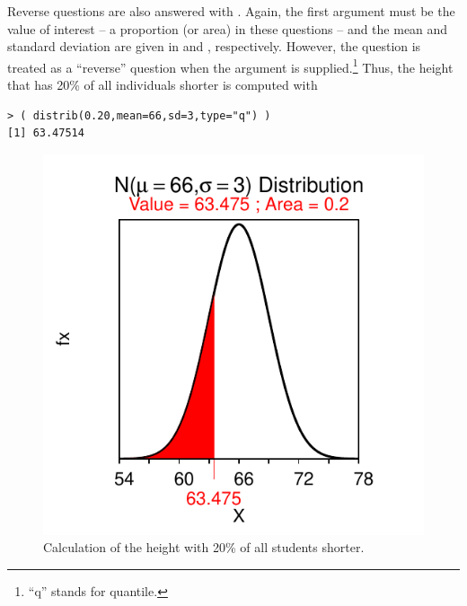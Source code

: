 \documentclass[10pt,openany]{book}\usepackage[]{graphicx}\usepackage[]{color}
\makeatletter
\newenvironment{kframe}{%
 \def\at@end@of@kframe{}%
 \ifinner\ifhmode%
  \def\at@end@of@kframe{\end{minipage}}%
  \begin{minipage}{\columnwidth}%
 \fi\fi%
 \def\FrameCommand##1{\hskip\@totalleftmargin \hskip-\fboxsep
 \colorbox{shadecolor}{##1}\hskip-\fboxsep
     \hskip-\linewidth \hskip-\@totalleftmargin \hskip\columnwidth}%
 \MakeFramed {\advance\hsize-\width
   \@totalleftmargin\z@ \linewidth\hsize
   \@setminipage}}%
 {\par\unskip\endMakeFramed%
 \at@end@of@kframe}
\newenvironment{knitrout}{}{} %
\makeatother
\begin{document}
Reverse questions are also answered with .  Again, the first argument must be the value of interest -- a proportion (or area) in these questions -- and the mean and standard deviation are given in  and , respectively.  However, the question is treated as a ``reverse'' question when the  argument is supplied.\footnote{``q'' stands for quantile.}  Thus, the height that has 20\% of all individuals shorter  is computed with
\begin{knitrout}
\color{fgcolor}\begin{kframe}
\begin{verbatim}
> ( distrib(0.20,mean=66,sd=3,type="q") )
[1] 63.47514
\end{verbatim}
\end{kframe}\begin{figure}[hbtp]

{\centering \includegraphics[width=.4\linewidth]{Figs/NormZCalc4-1} 

}

\caption[Calculation of the height with 20\% of all students shorter]{Calculation of the height with 20\% of all students shorter.}\label{fig:NormZCalc4}
\end{figure}


\end{knitrout}
\end{document}
